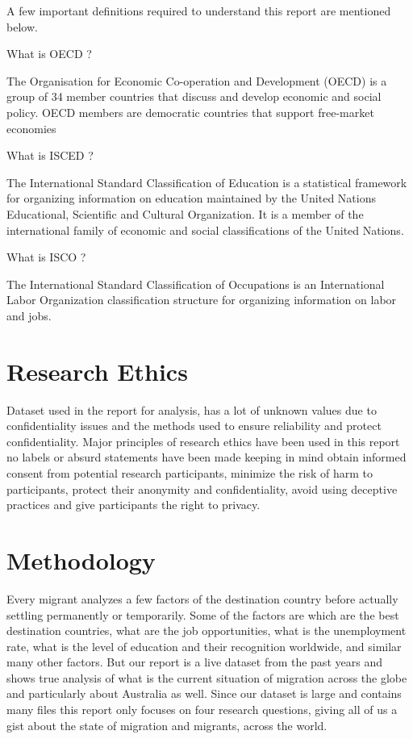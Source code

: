 \documentclass[11pt,a4paper,]{article}
\begin{document}
A few important definitions required to understand this report are mentioned below.

What is OECD ?

The Organisation for Economic Co-operation and Development (OECD) is a group of 34 member countries that discuss and develop economic and social policy. OECD members are democratic countries that support free-market economies

What is ISCED ?

The International Standard Classification of Education is a statistical framework for organizing information on education maintained by the United Nations Educational, Scientific and Cultural Organization. It is a member of the international family of economic and social classifications of the United Nations.

What is ISCO ?

The International Standard Classification of Occupations is an International Labor Organization classification structure for organizing information on labor and jobs.

\section*{Research Ethics}

Dataset used in the report for analysis, has a lot of unknown values due to confidentiality issues and the methods used to ensure reliability and protect confidentiality. Major principles of research ethics have been used in this report no labels or absurd statements have been made keeping in mind obtain informed consent from potential research participants, minimize the risk of harm to participants, protect their anonymity and confidentiality, avoid using deceptive practices and give participants the right to privacy.

\section*{Methodology}

Every migrant analyzes a few factors of the destination country before actually settling permanently or temporarily. Some of the factors are which are the best destination countries, what are the job opportunities, what is the unemployment rate, what is the level of education and their recognition worldwide, and similar many other factors. But our report is a live dataset from the past years and shows true analysis of what is the current situation of migration across the globe and particularly about Australia as well. Since our dataset is large and contains many files this report only focuses on four research questions, giving all of us a gist about the state of migration and migrants, across the world.
\end{document}
